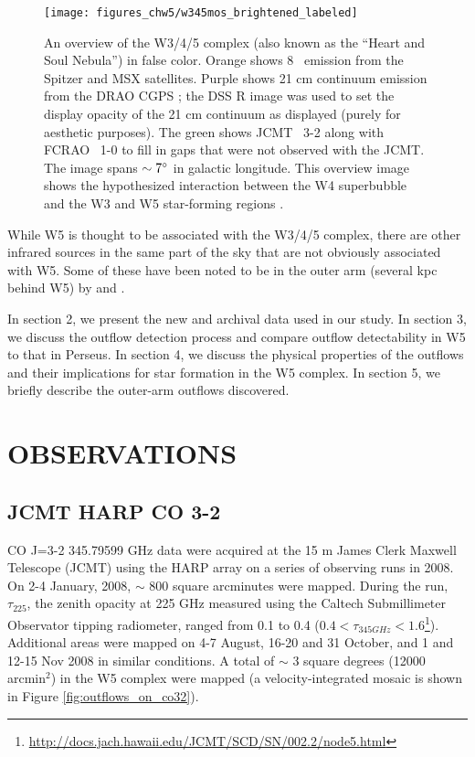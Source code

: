 \begin{figure*}
  \texttt{[image: figures\_chw5/w345mos\_brightened\_labeled]}
  \caption{An overview of the W3/4/5 complex (also known as the ``Heart and
  Soul Nebula'') in false color. Orange shows 8 \um\ emission from the Spitzer
  and MSX satellites.  Purple shows 21 cm continuum emission from the DRAO CGPS
  \citep{Taylor2003:CGPS}; the DSS R image was used to set the display opacity
  of the 21 cm continuum as displayed (purely for aesthetic purposes).  The
  green shows JCMT \twelveco\ 3-2 along with FCRAO \twelveco\ 1-0 to fill in 
  gaps that were not observed with the JCMT.  The image spans
  $\sim7\mbox{$^\circ$}$ in galactic longitude.  This overview image shows the
  hypothesized interaction between the W4 superbubble and the W3 and W5
  star-forming regions \citep{oey:hierarchical:2005}.}
  \label{fig:color_overview}
\end{figure*}

While W5 is thought to be associated with the W3/4/5 complex, there are other
infrared sources in the same part of the sky that are not obviously associated
with W5.  Some of these have been noted to be in the outer arm (several kpc
behind W5) by \citet{Digel1996} and \citet{Snell2002}.

\par
\par In section 2, we present the new and archival data used in our study.  In
section 3, we discuss the outflow detection process and compare outflow
detectability in W5 to that in Perseus.  In section 4, we discuss the physical
properties of the outflows and their implications for star formation in the W5
complex.  In section 5, we briefly describe the outer-arm outflows discovered.

\section{OBSERVATIONS}
\subsection{JCMT HARP CO 3-2}
CO J=3-2 345.79599 GHz data were acquired at the 15 m James Clerk Maxwell
Telescope (JCMT) using the HARP array on a series of observing runs in 2008.
On 2-4 January, 2008, $\sim$ 800 square arcminutes were mapped.  During the
run, $\tau_{225}$, the zenith opacity at 225 GHz measured using the Caltech
Submillimeter Observator tipping radiometer, ranged from 0.1 to 0.4
($0.4<\tau_{345
GHz}<1.6$\footnote{\url{http://docs.jach.hawaii.edu/JCMT/SCD/SN/002.2/node5.html}}).
Additional areas were mapped on 4-7 August, 16-20 and 31 October, and 1 and
12-15 Nov 2008 in similar conditions.  A total of $\sim$ 3 square degrees (12000
arcmin$^2$) in the W5 complex were mapped (a velocity-integrated mosaic is
shown in Figure \ref{fig:outflows_on_co32}).

